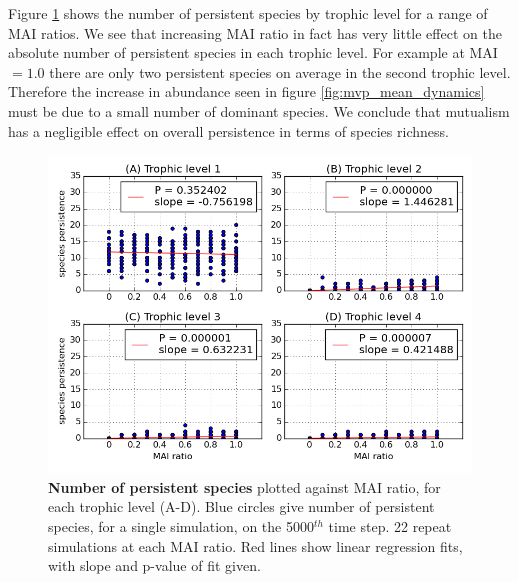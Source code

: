 Figure \ref{fig:mvp_species_per_tl} shows the number of persistent species by trophic level for a range of MAI ratios. We see that increasing MAI ratio in fact has very little effect on the absolute number of persistent species in each trophic level. For example at MAI$=1.0$ there are only two persistent species on average in the second trophic level. Therefore the increase in abundance seen in figure \ref{fig:mvp_mean_dynamics} must be due to a small number of dominant species. We conclude that mutualism has a negligible effect on overall persistence in terms of species richness.



\begin{figure}
	\centering
	\includegraphics[width=0.8\linewidth]{"figures/persistence/species_richness_per_trophic_level"}
	\caption[Number of persistent species versus MAI ratio.]{\textbf{Number of persistent species} plotted against MAI ratio, for each trophic level (A-D). Blue circles give number of persistent species, for a single simulation, on the 5000$^{th}$ time step. 22 repeat simulations at each MAI ratio. Red lines show linear regression fits, with slope and p-value of fit given.}
	\label{fig:mvp_species_per_tl}
\end{figure}

